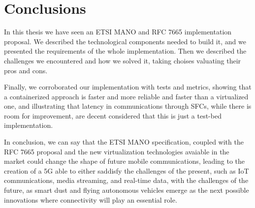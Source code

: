 \chapter{Conclusions}
\label{chap:conclusions}

In this thesis we have seen an ETSI MANO and RFC 7665 implementation proposal. 
We described the technological components needed to build it, and we presented 
the requirements of the whole implementation. Then we described the challenges 
we encountered and how we solved it, taking choises valuating their pros and 
cons.

Finally, we corroborated our implementation with tests and metrics, showing 
that a containerized approach is faster and more reliable and faster than a 
virtualized one, and illustrating that latency in communications through SFCs, 
while there is room for improvement, are decent considered that this is just 
a test-bed implementation.

In conclusion, we can say that the ETSI MANO specification, coupled with the 
RFC 7665 proposal and the new virtualization technologies avaiable in the 
market could change the shape of future mobile communications, leading to the 
creation of a 5G able to either saddisfy the challenges of the present, such as 
IoT communications, media streaming, and real-time data, with the challenges of 
the future, as smart dust and flying autonomous vehicles emerge as the next 
possible innovations where connectivity will play an essential role.
